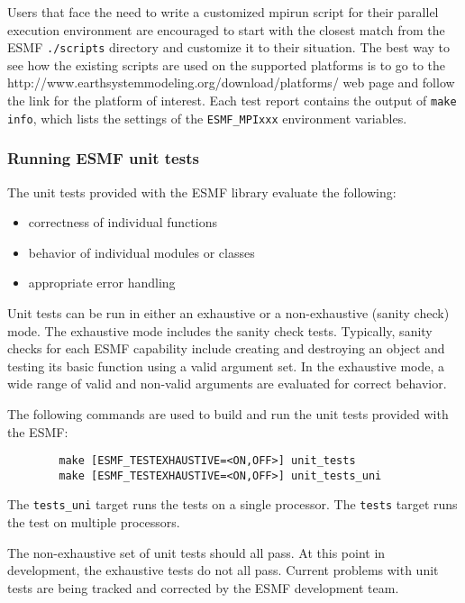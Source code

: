 \begin{sloppypar}
Users that face the need to write a customized mpirun script for their
parallel execution environment are encouraged to start with the closest match 
from the ESMF {\tt ./scripts} directory and customize it to their situation.
The best way to see how the existing scripts are used on the supported
platforms is to go to the 
{http://www.earthsystemmodeling.org/download/platforms/} web page and follow the link 
for the platform of interest. Each test report contains the output of
{\tt make info}, which lists the settings of the {\tt ESMF\_MPIxxx} 
environment variables.
\end{sloppypar}

\subsubsection{Running ESMF unit tests}

\label{UnitTestDescription}
The unit tests provided with the ESMF library evaluate the following:
\begin{itemize}
\item correctness of individual functions
\item behavior of individual modules or classes
\item appropriate error handling
\end{itemize}

Unit tests can be run in either an exhaustive or a non-exhaustive (sanity check)
mode.  The exhaustive mode includes the sanity check tests.  Typically, sanity
checks for each ESMF capability include creating and destroying an object and 
testing its basic function using a valid argument set.  In the exhaustive mode,
a wide range of valid and non-valid arguments are evaluated for correct behavior.

\label{RunUnitTests}

The following commands are used to build and run the unit tests provided with 
the ESMF:
\begin{verbatim}
        make [ESMF_TESTEXHAUSTIVE=<ON,OFF>] unit_tests
        make [ESMF_TESTEXHAUSTIVE=<ON,OFF>] unit_tests_uni
\end{verbatim}

The {\tt tests\_uni} target runs the tests on a single processor. 
The {\tt tests} target runs the test on multiple processors.

The non-exhaustive set of unit tests should all pass.  At this point in 
development, the exhaustive tests do not all pass.  Current problems with 
unit tests are being tracked and corrected by the ESMF development team.

